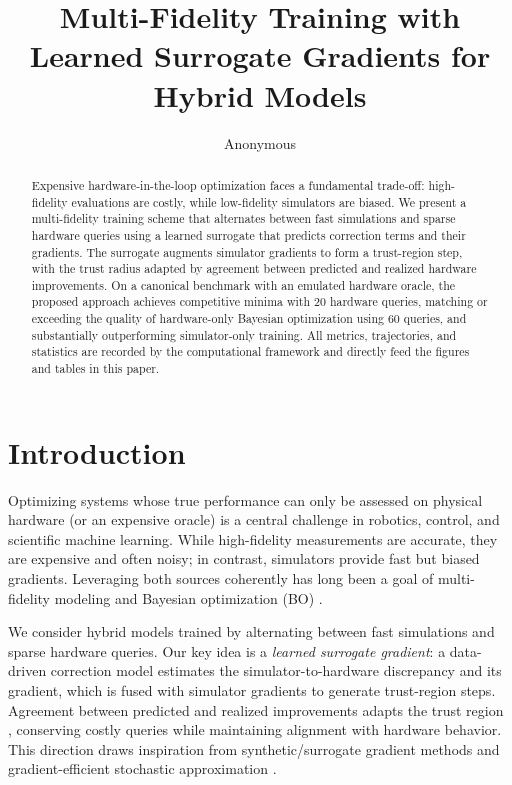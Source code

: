 \title{Multi-Fidelity Training with Learned Surrogate Gradients for Hybrid Models}
\author{Anonymous}
\date{}


\maketitle

\begin{abstract}
Expensive hardware-in-the-loop optimization faces a fundamental trade-off: high-fidelity evaluations are costly, while low-fidelity simulators are biased. We present a multi-fidelity training scheme that alternates between fast simulations and sparse hardware queries using a learned surrogate that predicts correction terms and their gradients. The surrogate augments simulator gradients to form a trust-region step, with the trust radius adapted by agreement between predicted and realized hardware improvements. On a canonical benchmark with an emulated hardware oracle, the proposed approach achieves competitive minima with 20 hardware queries, matching or exceeding the quality of hardware-only Bayesian optimization using 60 queries, and substantially outperforming simulator-only training. All metrics, trajectories, and statistics are recorded by the computational framework and directly feed the figures and tables in this paper.
\end{abstract}

\section{Introduction}
Optimizing systems whose true performance can only be assessed on physical hardware (or an expensive oracle) is a central challenge in robotics, control, and scientific machine learning. While high-fidelity measurements are accurate, they are expensive and often noisy; in contrast, simulators provide fast but biased gradients. Leveraging both sources coherently has long been a goal of multi-fidelity modeling \citep{Kennedy2000,Kennedy2001,Forrester2007,Perdikaris2017} and Bayesian optimization (BO) \citep{Shahriari2016,Kandasamy2017,Swersky2013,Song2019,Eriksson2019}.

We consider hybrid models trained by alternating between fast simulations and sparse hardware queries. Our key idea is a \emph{learned surrogate gradient}: a data-driven correction model estimates the simulator-to-hardware discrepancy and its gradient, which is fused with simulator gradients to generate trust-region steps. Agreement between predicted and realized improvements adapts the trust region \citep{Conn2000}, conserving costly queries while maintaining alignment with hardware behavior. This direction draws inspiration from synthetic/surrogate gradient methods \citep{Jaderberg2017,Neftci2019} and gradient-efficient stochastic approximation \citep{Spall1992}.

